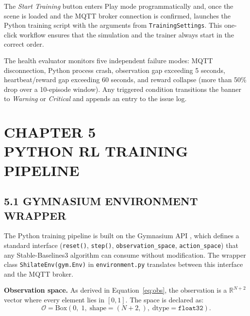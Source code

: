 \documentclass[12pt,a4paper]{article}
\begin{document}
The \emph{Start Training} button enters Play mode programmatically and, once
the scene is loaded and the MQTT broker connection is confirmed, launches the
Python training script with the arguments from \texttt{TrainingSettings}. This
one-click workflow ensures that the simulation and the trainer always start in
the correct order.

The health evaluator monitors five independent failure modes: MQTT
disconnection, Python process crash, observation gap exceeding 5 seconds,
heartbeat/reward gap exceeding 60 seconds, and reward collapse (more than 50\%
drop over a 10-episode window). Any triggered condition transitions the banner
to \emph{Warning} or \emph{Critical} and appends an entry to the issue log.

\clearpage

\section*{\centering CHAPTER 5\\[0.3cm] PYTHON RL TRAINING PIPELINE}
\vspace{2\baselineskip}

\subsection*{5.1 \quad GYMNASIUM ENVIRONMENT WRAPPER}

\indent The Python training pipeline is built on the Gymnasium API
\cite{Towers2024}, which defines a standard interface (\texttt{reset()},
\texttt{step()}, \texttt{observation\_space}, \texttt{action\_space}) that any
Stable-Baselines3 algorithm can consume without modification. The wrapper class
\texttt{ShilateEnv(gym.Env)} in \texttt{environment.py} translates between
this interface and the MQTT broker.

\textbf{Observation space.} As derived in Equation~\ref{eq:obs}, the
observation is a $\mathbb{R}^{N+2}$ vector where every element lies in
$[0, 1]$. The space is declared as:
\begin{equation*}
  \mathcal{O} = \text{Box}(0,\; 1,\; \text{shape}=(N+2,),\; \text{dtype}=\texttt{float32}).
\end{equation*}
\end{document}
